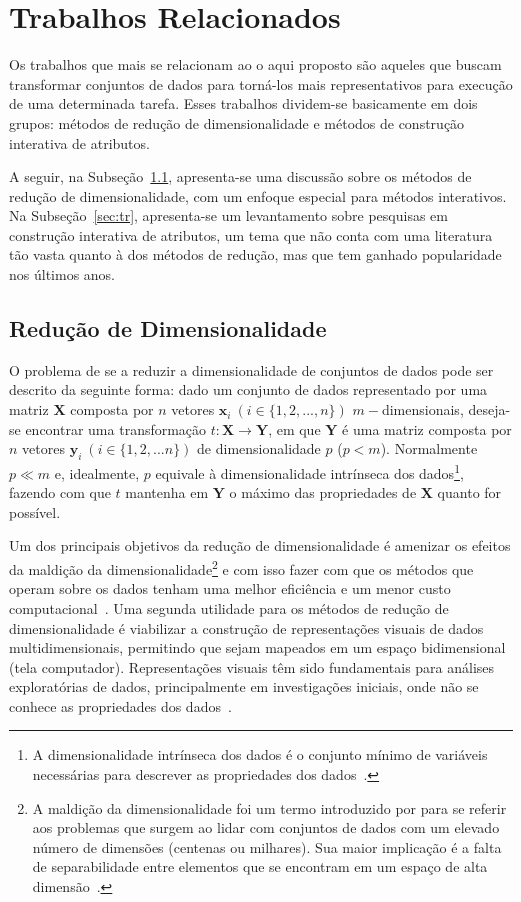 \section{Trabalhos Relacionados}\label{sec:related}

Os trabalhos que mais se relacionam ao o aqui proposto são
aqueles que buscam transformar conjuntos de dados para
torná-los mais representativos para execução de uma
determinada tarefa. Esses trabalhos dividem-se basicamente
em dois grupos: métodos de redução de dimensionalidade e
métodos de construção interativa de atributos. 

A seguir, na Subseção~\ref{sec:rd}, apresenta-se uma
discussão sobre os métodos de redução de dimensionalidade,
com um enfoque especial para métodos interativos. Na
Subseção~\ref{sec:tr}, apresenta-se um levantamento sobre
pesquisas em construção interativa de atributos, um tema que
não conta com uma literatura tão vasta quanto à dos métodos
de redução, mas que tem ganhado popularidade nos últimos
anos. 

\subsection{Redução de Dimensionalidade}\label{sec:rd}

O problema de se a reduzir a dimensionalidade de conjuntos
de dados pode ser descrito da seguinte forma: dado um
conjunto de dados representado por uma matriz $\textbf{X}$
composta por $n$ vetores $\textbf{x}_i~(i \in
\{1,2,...,n\})$ $m-$dimensionais, deseja-se encontrar uma
transformação $t: \textbf{X} \rightarrow \textbf{Y}$, em que
$\textbf{Y}$ é uma matriz composta por $n$ vetores
$\textbf{y}_i~(i \in \{1,2,...n\})$ de dimensionalidade $p$
($p < m$).  Normalmente $p \ll m$ e, idealmente, $p$
equivale à dimensionalidade intrínseca dos dados\footnote{A
dimensionalidade intrínseca dos dados é o conjunto
mínimo de variáveis necessárias para descrever as
propriedades dos dados~\cite{Fukunaga1990}.}, fazendo
com que $t$ mantenha em $\textbf{Y}$ o máximo das
propriedades de $\textbf{X}$ quanto for possível. 

Um dos principais objetivos da redução de dimensionalidade é
amenizar os efeitos da maldição da
dimensionalidade\footnote{A maldição da dimensionalidade foi
    um termo introduzido por \citet{Bellman1961} para se
    referir aos problemas que surgem ao lidar com conjuntos
    de dados com um elevado número de dimensões (centenas ou
    milhares). Sua maior implicação é a falta de
separabilidade entre elementos que se encontram em um espaço
de alta dimensão~\cite{Kouiroukidis2011}.} e com isso fazer
com que os métodos que operam sobre os dados tenham uma
melhor eficiência e um menor custo
computacional~\cite{Maaten2009}.  
Uma segunda utilidade para os métodos de redução de
dimensionalidade é viabilizar a construção de representações
visuais de dados multidimensionais, permitindo que sejam
mapeados em um espaço bidimensional (tela computador).
Representações visuais têm sido fundamentais para análises
exploratórias de dados, principalmente em investigações
iniciais, onde não
se conhece as propriedades dos dados~\cite{Kaski2011}. 

